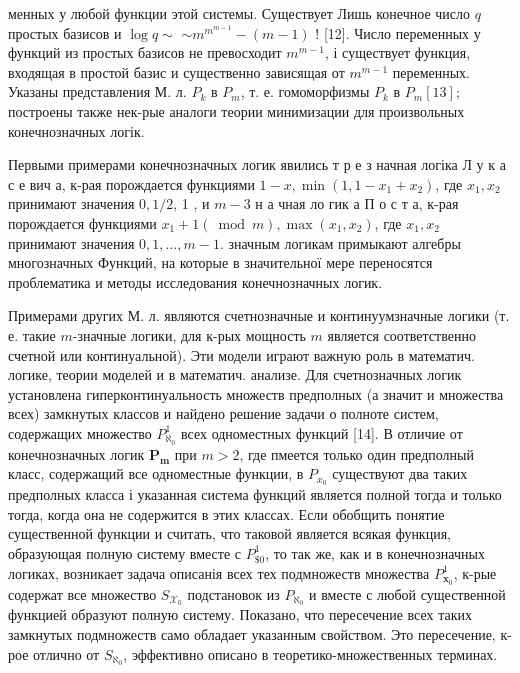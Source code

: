 \documentclass[10pt]{article}
\begin{document}
менных у любой функции этой системы. Существует Лишь конечное число $q$ простых базисов и $\log q \sim$ $\sim m^{m^{m-1}}-(m-1)$ ! [12]. Число переменных у функций из простых базисов не превосходит $m^{m-1}$, і существует функция, входящая в простой базис и существенно зависящая от $m^{m-1}$ переменных. Указаны представления М. л. $P_{k}$ в $P_{m}$, т. е. гомоморфизмы $P_{k}$ в $P_{m}[13] ;$ построены также нек-рые аналоги теории минимизации для произвольных конечнозначных логік.



Первыми примерами конечнозначных логик явились т р е з начная логіка Л у к а с е вич а, к-рая порождается функциями $1-x, \min \left(1,1-x_{1}+x_{2}\right)$, где $x_{1}, x_{2}$ принимают значения $0,1 / 2$, 1 , и $m-3$ н а чная ло гик а П о с т а, к-рая порождается функциями $x_{1}+1(\bmod m), \max \left(x_{1}, x_{2}\right)$, где $x_{1}, x_{2}$ принимают значения $0,1, \ldots, m-1$. значным логикам примыкают алгебры многозначных Функций, на которые в значительної мере переносятся проблематика и методы исследования конечнозначных логик.



Примерами других М. л. являются счетнозначные и континуумзначные логики (т. е. такие $m$-значные логики, для к-рых мощность $m$ является соответственно счетной или континуальной). Эти модели играют важную роль в математич. логике, теории моделей и в математич. анализе. Для счетнозначных логик установлена гиперконтинуальность множеств предполных (а значит и множества всех) замкнутых классов и найдено решение задачи о полноте систем, содержащих множество $P_{\aleph_{0}}^{1}$ всех одноместных функций [14]. В отличие от конечнозначных логик $\boldsymbol{P}_{\boldsymbol{m}}$ при $m>2$, где пмеется только один предполный класс, содержащий все одноместные функции, в $P_{x_{0}}$ существуют два таких предполных класса і указанная система функций является полной тогда и только тогда, когда она не содержится в этих классах. Если обобщить понятие существенной функции и считать, что таковой является всякая функция, образующая полную систему вместе с $P_{\$ 0}^{1}$, то так же, как и в конечнозначных логиках, возникает задача описанія всех тех подмножеств множества $P_{\boldsymbol{x}_{0}}^{1}$, к-рые содержат все множество $S_{\mathcal{X}_{0}}$ подстановок из $P_{\aleph_{0}}$ и вместе с любой существенной функцией образуют полную систему. Показано, что пересечение всех таких замкнутых подмножеств само обладает указанным свойством. Это пересечение, к-рое отлично от $S_{\aleph_{0}}$, эффективно описано в теоретико-множественных терминах.
\end{document}
